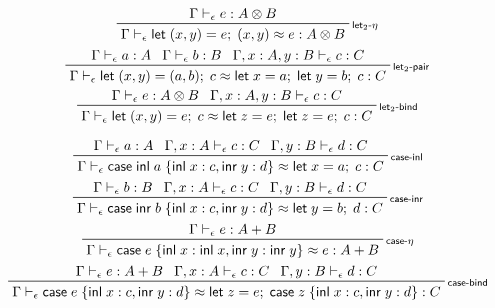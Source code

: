 \documentclass[acmsmall,screen,review]{acmart}
\newcommand{\ms}[1]{\ensuremath{\mathsf{#1}}}
\newcommand{\lto}{:}
\newcommand{\linl}[1]{\ms{inl}\;{#1}}
\newcommand{\linr}[1]{\ms{inr}\;{#1}}
\newcommand{\letexpr}[3]{\ensuremath{\ms{let}\;#1 = #2;\;#3}}
\newcommand{\caseexpr}[5]{\ms{case}\;#1\;\{\linl{#2} \lto #3, \linr{#4} \lto #5\}}
\newcommand{\bhyp}[2]{#1 : #2}
\newcommand{\rle}[1]{{\scriptsize\textsf{#1}}}
\newcommand{\hasty}[4]{#1 \vdash_{#2} #3: {#4}}
\newcommand{\teqv}{\approx}
\newcommand{\tmeq}[5]{#1 \vdash_{#2} #3 \teqv #4 : {#5}}
\begin{document}
\begin{gather*}
  \prftree[r]{\rle{let$_2$-$\eta$}}
    {\hasty{\Gamma}{\epsilon}{e}{A \otimes B}}
    {\tmeq{\Gamma}{\epsilon}{\letexpr{(x, y)}{e}{(x, y)}}{e}{A \otimes B}} 
  \\
  \prftree[r]{\rle{let$_2$-pair}}
    {\hasty{\Gamma}{\epsilon}{a}{A}}
    {\hasty{\Gamma}{\epsilon}{b}{B}}
    {\hasty{\Gamma, \bhyp{x}{A}, \bhyp{y}{B}}{\epsilon}{c}{C}}
    {\tmeq{\Gamma}{\epsilon}{\letexpr{(x, y)}{(a, b)}{c}}{\letexpr{x}{a}{\letexpr{y}{b}{c}}}{C}}
  \\
  \prftree[r]{\rle{let$_2$-bind}}
    {\hasty{\Gamma}{\epsilon}{e}{A \otimes B}}
    {\hasty{\Gamma, \bhyp{x}{A}, \bhyp{y}{B}}{\epsilon}{c}{C}}
    {\tmeq{\Gamma}{\epsilon}
      {\letexpr{(x, y)}{e}{c}}
      {\letexpr{z}{e}{\letexpr{z}{e}{c}}}{C}}
\end{gather*}

\begin{gather*}
  \prftree[r]{\rle{case-inl}}
    {\hasty{\Gamma}{\epsilon}{a}{A}}
    {\hasty{\Gamma, \bhyp{x}{A}}{\epsilon}{c}{C}}
    {\hasty{\Gamma, \bhyp{y}{B}}{\epsilon}{d}{C}}
    {\tmeq{\Gamma}{\epsilon}{\caseexpr{\linl{a}}{x}{c}{y}{d}}{\letexpr{x}{a}{c}}{C}}
  \\
  \prftree[r]{\rle{case-inr}}
    {\hasty{\Gamma}{\epsilon}{b}{B}}
    {\hasty{\Gamma, \bhyp{x}{A}}{\epsilon}{c}{C}}
    {\hasty{\Gamma, \bhyp{y}{B}}{\epsilon}{d}{C}}
    {\tmeq{\Gamma}{\epsilon}{\caseexpr{\linr{b}}{x}{c}{y}{d}}{\letexpr{y}{b}{d}}{C}}
  \\
  \prftree[r]{\rle{case-$\eta$}}
    {\hasty{\Gamma}{\epsilon}{e}{A + B}}
    {\tmeq{\Gamma}{\epsilon}{\caseexpr{e}{x}{\linl{x}}{y}{\linr{y}}}{e}{A + B}}
  \\
  \prftree[r]{\rle{case-bind}}
    {\hasty{\Gamma}{\epsilon}{e}{A + B}}
    {\hasty{\Gamma, \bhyp{x}{A}}{\epsilon}{c}{C}}
    {\hasty{\Gamma, \bhyp{y}{B}}{\epsilon}{d}{C}}
    {\tmeq{\Gamma}{\epsilon}{\caseexpr{e}{x}{c}{y}{d}}{\letexpr{z}{e}{\caseexpr{z}{x}{c}{y}{d}}}{C}}
\end{gather*}
\end{document}
